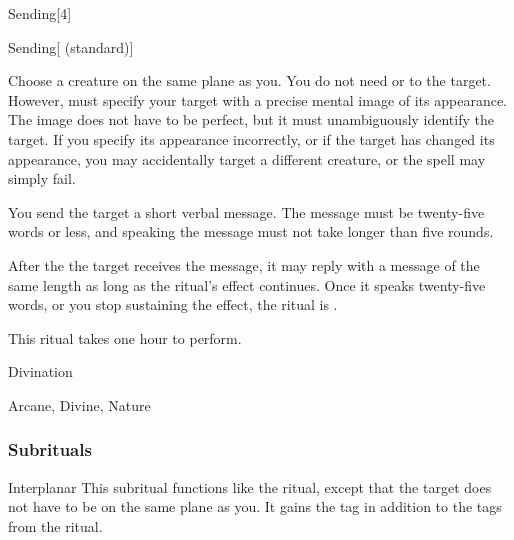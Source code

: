 \begin{spellsection}{Sending}[4]


\begin{ability}{Sending}[ (standard)]

Choose a creature on the same plane as you.
You do not need  or  to the target.
However,  must specify your target with a precise mental image of its appearance.
The image does not have to be perfect, but it must unambiguously identify the target.
If you specify its appearance incorrectly, or if the target has changed its appearance, you may accidentally target a different creature, or the spell may simply fail.

You send the target a short verbal message.
The message must be twenty-five words or less, and speaking the message must not take longer than five rounds.

After the the target receives the message, it may reply with a message of the same length as long as the ritual's effect continues.
Once it speaks twenty-five words, or you stop sustaining the effect, the ritual is .

This ritual takes one hour to perform.

\end{ability}




 Divination

 Arcane, Divine, Nature
\end{spellsection}


\subsubsection{Subrituals}


\begin{ability}[\nth{6}]{Interplanar}
This subritual functions like the  ritual, except that the target does not have to be on the same plane as you.
It gains the  tag in addition to the tags from the  ritual.
\end{ability}
\vspace{0.25em}


